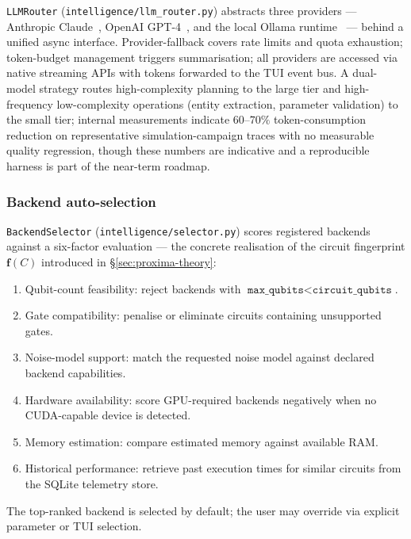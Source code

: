 \documentclass[11pt,a4paper]{article}
\begin{document}
\texttt{LLMRouter} (\texttt{intelligence/llm\_router.py}) abstracts three
providers --- Anthropic Claude~\cite{anthropic_claude}, OpenAI
GPT-4~\cite{openai_gpt4}, and the local Ollama runtime~\cite{ollama} --- behind a
unified async interface. Provider-fallback covers rate limits and quota
exhaustion; token-budget management triggers summarisation; all providers are
accessed via native streaming APIs with tokens forwarded to the TUI event bus.
A dual-model strategy routes high-complexity planning to the large tier and
high-frequency low-complexity operations (entity extraction, parameter
validation) to the small tier; internal measurements indicate $60\text{--}70\%$
token-consumption reduction on representative simulation-campaign traces with no
measurable quality regression, though these numbers are indicative and a
reproducible harness is part of the near-term roadmap.

\subsubsection*{Backend auto-selection}

\texttt{BackendSelector} (\texttt{intelligence/selector.py}) scores registered
backends against a six-factor evaluation --- the concrete realisation of the
circuit fingerprint $\mathbf{f}(C)$ introduced in \S\ref{sec:proxima-theory}:

\begin{enumerate}[leftmargin=1.5cm]
  \item Qubit-count feasibility: reject backends with
        $\texttt{max\_qubits} < \texttt{circuit\_qubits}$.
  \item Gate compatibility: penalise or eliminate circuits containing
        unsupported gates.
  \item Noise-model support: match the requested noise model against declared
        backend capabilities.
  \item Hardware availability: score GPU-required backends negatively when no
        CUDA-capable device is detected.
  \item Memory estimation: compare estimated memory against available RAM.
  \item Historical performance: retrieve past execution times for similar
        circuits from the SQLite telemetry store.
\end{enumerate}

The top-ranked backend is selected by default; the user may override via explicit
parameter or TUI selection.
\end{document}
